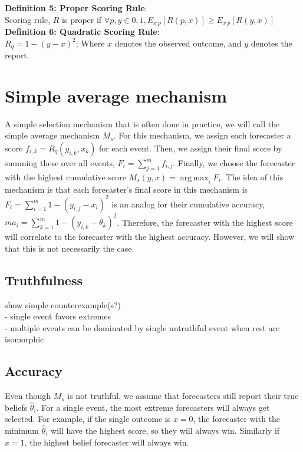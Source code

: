 \documentclass[letterpaper,12pt]{article}
\DeclareMathOperator*{\argmax}{arg\,max}
\newcommand{\1}{\mathbbm{1}}
\begin{document}
\textbf{Definition 5: Proper Scoring Rule}:\\
Scoring rule, $R$ is proper if $\forall p,y \in {0,1}, E_{x~p}[R(p,x)] \ge E_{x~p}[R(y,x)]$\\

\textbf{Definition 6: Quadratic Scoring Rule}:\\
$R_q = 1 - (y - x)^2$; Where $x$ denotes the observed outcome, and $y$ denotes the report.

\section{Simple average mechanism}
A simple selection mechanism that is often done in practice, we will call the simple average mechanism $M_s$. For this mechanism, we assign each forecaster a score $f_{i, k} = R_q(y_{i, k}, x_k)$ for each event. Then, we assign their final score by summing these over all events, $F_i = \sum_{j=1}^m f_{i, j}$. Finally, we choose the forecaster with the highest cumulative score $M_s(y, x) = \argmax_i F_i$. The idea of this mechanism is that each forecaster's final score in this mechanism is $F_i = \sum_{i=1}^m 1 - (y_{i, j} - x_i)^2$ is an analog for their cumulative accuracy, $m a_i = \sum_{k=1}^m 1 - (y_{i, k} - \theta_k)^2$. Therefore, the forecaster with the highest score will correlate to the forecaster with the highest accuracy. However, we will show that this is not necessarily the case. 

\subsection{Truthfulness}
show simple counterexample(s?) \\
- single event favors extremes \\
- multiple events can be dominated by single untruthful event when rest are isomorphic \\

\subsection{Accuracy}
Even though $M_s$ is not truthful, we assume that forecasters still report their true beliefs $\hat \theta_i$. For a single event, the most extreme forecasters will always get selected. For example, if the single outcome is $x = 0$, the forecaster with the minimum $\hat \theta_i $ will have the highest score, so they will always win. Similarly if $x = 1$, the highest belief forecaster will always win. 
\end{document}

